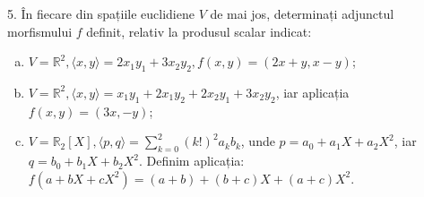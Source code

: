 \documentclass[11pt,a4paper]{article}
\newcommand\ds{\displaystyle}
\newcommand\RR{\mathbb{R}}
\theoremstyle{dotless}
\theoremstyle{dotlessdr}
\begin{document}
\vspace{1cm}

5. În fiecare din spațiile euclidiene $V$ de mai jos, determinați adjunctul morfismului $f$ definit,
relativ la produsul scalar indicat:
\begin{enumerate}[(a)]
\item $V = \RR^2, \langle x, y \rangle = 2x_1 y_1 + 3x_2 y_2, f(x, y) = (2x + y, x - y)$;
\item $V = \RR^2, \langle x, y \rangle = x_1y_1 + 2x_1y_2 + 2x_2 y_1 + 3x_2 y_2$, iar aplicația
  $f(x, y) = (3x, -y)$;
\item $V = \RR_2[X], \langle p, q \rangle = \ds\sum_{k = 0}^2 (k!)^2 a_k b_k$, unde
  $p = a_0 + a_1 X + a_2 X^2$, iar $q = b_0 + b_1 X + b_2 X^2$. Definim aplicația:
  $f(a + bX + cX^2) = (a + b) + (b + c)X + (a + c)X^2$.
\end{enumerate}
\end{document}
